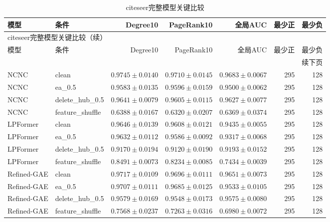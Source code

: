 \documentclass[UTF8,a4paper,11pt,fontset=fandol]{ctexart}
\begin{document}
{\footnotesize
\setlength{\tabcolsep}{3pt}
\begin{longtable}{llrrr rr}
\caption{citeseer完整模型关键比较}\\
\toprule
模型 & 条件 & Degree10 & PageRank10 & 全局AUC & 最少正 & 最少负 \\
\midrule
\endfirsthead
\multicolumn{7}{l}{citeseer完整模型关键比较（续）}\\
\toprule
模型 & 条件 & Degree10 & PageRank10 & 全局AUC & 最少正 & 最少负 \\
\midrule
\endhead
\midrule\multicolumn{7}{r}{续下页}\\
\endfoot
\bottomrule\endlastfoot
NCNC & clean & $0.9745\pm0.0140$ & $0.9710\pm0.0145$ & $0.9683\pm0.0067$ & 295 & 128 \\
NCNC & ea\_0.5 & $0.9583\pm0.0135$ & $0.9596\pm0.0159$ & $0.9500\pm0.0062$ & 295 & 128 \\
NCNC & delete\_hub\_0.5 & $0.9641\pm0.0079$ & $0.9605\pm0.0115$ & $0.9627\pm0.0077$ & 295 & 128 \\
NCNC & feature\_shuffle & $0.6388\pm0.0167$ & $0.6320\pm0.0207$ & $0.6369\pm0.0374$ & 295 & 128 \\
LPFormer & clean & $0.9646\pm0.0139$ & $0.9608\pm0.0121$ & $0.9435\pm0.0055$ & 295 & 128 \\
LPFormer & ea\_0.5 & $0.9632\pm0.0112$ & $0.9586\pm0.0092$ & $0.9317\pm0.0068$ & 295 & 128 \\
LPFormer & delete\_hub\_0.5 & $0.9170\pm0.0194$ & $0.9120\pm0.0190$ & $0.9193\pm0.0152$ & 295 & 128 \\
LPFormer & feature\_shuffle & $0.8491\pm0.0073$ & $0.8234\pm0.0085$ & $0.7434\pm0.0039$ & 295 & 128 \\
Refined-GAE & clean & $0.9717\pm0.0109$ & $0.9696\pm0.0111$ & $0.9651\pm0.0073$ & 295 & 128 \\
Refined-GAE & ea\_0.5 & $0.9707\pm0.0111$ & $0.9685\pm0.0125$ & $0.9533\pm0.0105$ & 295 & 128 \\
Refined-GAE & delete\_hub\_0.5 & $0.9579\pm0.0169$ & $0.9548\pm0.0173$ & $0.9575\pm0.0080$ & 295 & 128 \\
Refined-GAE & feature\_shuffle & $0.7568\pm0.0237$ & $0.7263\pm0.0316$ & $0.6980\pm0.0072$ & 295 & 128 \\
\end{longtable}
}
\end{document}
